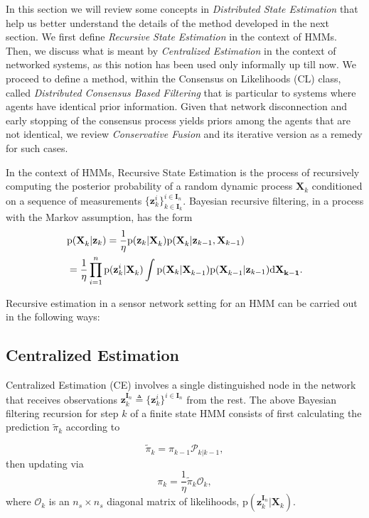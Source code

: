 \documentclass[journal]{IEEEtran}
\newcommand{\vect}[1]{{\mathbf{#1}}}
\theoremstyle{remark}
\newcommand{\pr}{\textrm{p}}
\newcommand{\XX}[3][2]{\mathbf{X}_{  #2}^{ #3}}
\newcommand{\bIn}{\boldsymbol{I}_{{n}}}
\newcommand{\bIk}{\boldsymbol{I}_{{k}}}
\newcommand{\zz}[3][2]{\mathbf{z}_{ #2}^{ #3}}
\theoremstyle{definition}
\begin{document}
In this section we will review some concepts in \textit{Distributed State
 Estimation} that help us better understand the details of the method developed
in the next section. We first define \textit{Recursive State Estimation} in the
context of HMMs. Then, we discuss what is meant by \textit{Centralized
 Estimation} in the context of networked systems, as this notion has 
been used only informally up till now.
We proceed to define a method,
within the Consensus on Likelihoods (CL) class, called \textit{Distributed
 Consensus Based Filtering} that is particular to systems where agents have
identical prior information. Given that network disconnection and early
stopping of the consensus process yields priors among the
agents that are not identical, we review \textit{Conservative Fusion} and its iterative version as a
remedy for such cases. 

In the context of HMMs, Recursive State Estimation is the process of
recursively computing the posterior probability of a random dynamic process
$\XX[]{k}{}$ conditioned on a sequence of measurements
$\{\zz{k}{i}\}^{i\in\bIn}_{k\in\bIk}$. Bayesian recursive filtering, in a
process with the Markov assumption, has the form
\begin{align}
\label{eq:geb}
&\pr(\XX[]{k}{}|\vect{z}_{k})  = \frac{1}{\eta}\pr(\vect{z}_{k}| \XX[]{k}{})\pr(\XX[]{k}{}|\vect{z}_{k-1},\vect{X}_{k-1}) \\
&= \frac{1}{\eta}\prod_{i=1}^{n} \pr(\vect{z}_{k}^i | \XX[]{k}{}) \int \pr(\vect{X}_{k} | \XX[]{k-1}{}) \pr(\XX[]{k-1}{}|\vect{z}_{k-1}) \text{d}\vect{\XX[]{k-1}}.\nonumber 
\end{align}

Recursive estimation in a sensor network setting for an HMM
can be carried out in the following ways:

\subsection{Centralized Estimation}

Centralized Estimation (CE) involves a single distinguished node in the
network that receives observations $\zz{k}{\bIn} \triangleq
\{\zz{k}{i}\}^{i\in\bIn}$ from the rest. The above Bayesian filtering recursion
for step $k$ of a finite state HMM consists of first calculating the prediction
$\tilde{\pi}_{k}$ according to 

\begin{equation}
\label{eq:pred}
\tilde{\pi}_{k} =  \pi_{k-1}\mathcal{P}_{k \vert k-1},
\end{equation}
then updating via
\begin{equation}
\label{eq:update}
{\pi}_{k} = \frac{1}{\eta}\tilde{\pi}_{k} \mathcal{O}_k,
\end{equation}
where $\mathcal{O}_k$ is an $n_s\times n_s$ diagonal matrix of likelihoods, $\pr(\zz{k}{\bIn}| \XX[]{k}{})$.  
\end{document}
